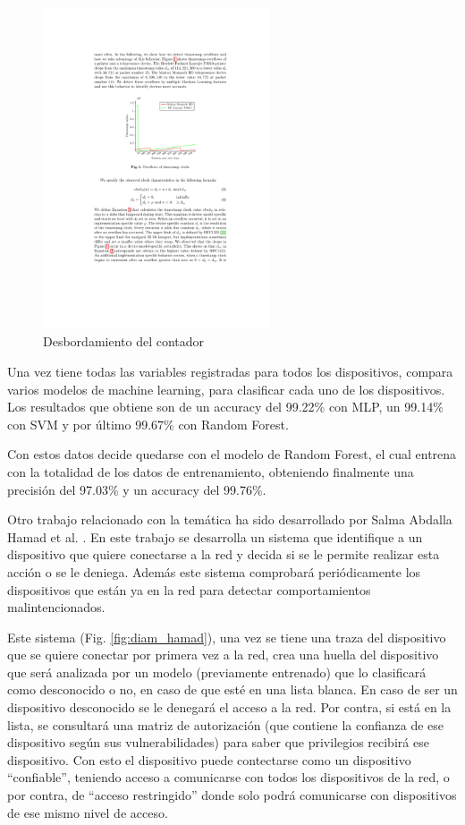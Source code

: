 \begin{figure}[htpb!]
    \centering
    \includegraphics[width=0.6\textwidth]{images/CERN-timestamp_overflow}
    \caption{Desbordamiento del contador \cite{oser2018identifying}}
    \label{fig:cern_ts_overflow}
\end{figure}

Una vez tiene todas las variables registradas para todos los dispositivos, compara varios modelos de machine learning, para clasificar cada uno de los dispositivos. Los resultados que obtiene son de un accuracy del 99.22\% con MLP, un 99.14\% con SVM y por último 99.67\% con Random Forest.

Con estos datos decide quedarse con el modelo de Random Forest, el cual entrena con la totalidad de los datos de entrenamiento, obteniendo finalmente una precisión del 97.03\% y un accuracy del 99.76\%.

Otro trabajo relacionado con la temática ha sido desarrollado por Salma Abdalla Hamad et al. \cite{hamad2019iot}. En este trabajo se desarrolla un sistema que identifique a un dispositivo que quiere conectarse a la red y decida si se le permite realizar esta acción o se le deniega. Además este sistema comprobará periódicamente los dispositivos que están ya en la red para detectar comportamientos malintencionados. 

Este sistema (Fig. \ref{fig:diam_hamad}), una vez se tiene una traza del dispositivo que se quiere conectar por primera vez a la red, crea una huella del dispositivo que será analizada por un modelo (previamente entrenado) que lo clasificará como desconocido o no, en caso de que esté en una lista blanca. En caso de ser un dispositivo desconocido se le denegará el acceso a la red. Por contra, si está en la lista, se consultará una matriz de autorización (que contiene la confianza de ese dispositivo según sus vulnerabilidades) para saber que privilegios recibirá ese dispositivo. Con esto el dispositivo puede contectarse como un dispositivo ``confiable'', teniendo acceso a comunicarse con todos los dispositivos de la red, o por contra, de ``acceso restringido'' donde solo podrá comunicarse con dispositivos de ese mismo nivel de acceso.

